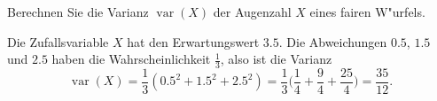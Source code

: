 Berechnen Sie die Varianz $\operatorname{var}(X)$
der Augenzahl $X$ eines fairen W"urfels.

\begin{loesung}
Die Zufallsvariable $X$ hat den Erwartungswert $3.5$. Die Abweichungen
$0.5$, $1.5$ und $2.5$ haben die Wahrscheinlichkeit $\frac13$, also ist
die Varianz
\[
\operatorname{var}(X)=\frac13(0.5^2+1.5^2+2.5^2)=\frac13\biggl(
\frac14+\frac94+\frac{25}{4}
\biggr)
=\frac{35}{12}.
\]
\end{loesung}

